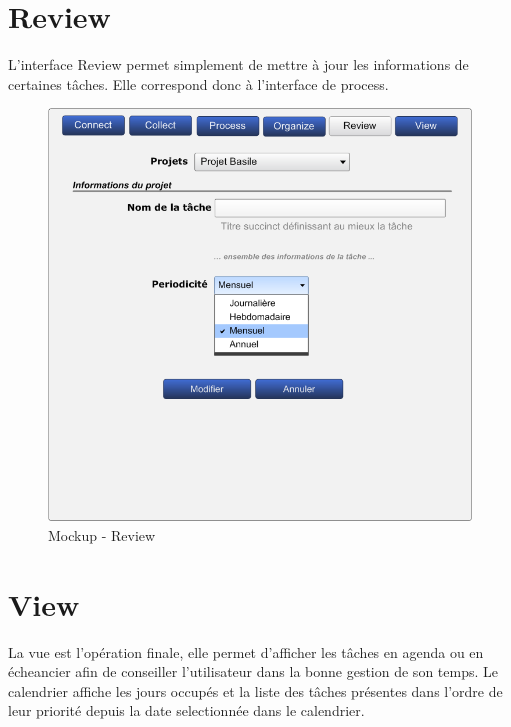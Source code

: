 \section{Review}
L'interface Review permet simplement de mettre à jour les informations de
certaines tâches. Elle correspond donc à l'interface de process.

\begin{figure}[H]
  \begin{center}
  \includegraphics[scale=0.5]{livrable2/images/review.png}
  \caption{Mockup - Review}
  \end{center}
\end{figure}

\section{View}
La vue est l'opération finale, elle permet d'afficher les tâches en agenda ou
en écheancier afin de conseiller l'utilisateur dans la bonne gestion de son
temps. Le calendrier affiche les jours occupés et la liste des tâches présentes
dans l'ordre de leur priorité depuis la date selectionnée dans le
calendrier.

